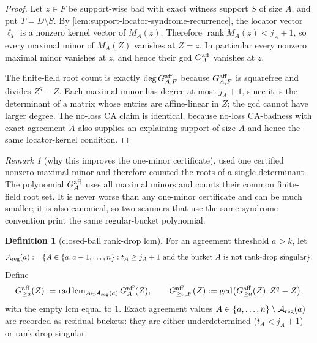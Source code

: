 \documentclass[11pt]{article}
\theoremstyle{definition}
\newtheorem{definition}[theorem]{Definition}
\theoremstyle{remark}
\newtheorem{remark}[theorem]{Remark}
\begin{document}
\begin{proof}
Let $z\in F$ be support-wise bad with exact witness support $S$ of size $A$, and
put $T=D\setminus S$.  By \cref{lem:support-locator-syndrome-recurrence}, the
locator vector $\boldsymbol\ell_T$ is a nonzero kernel vector of $M_A(z)$.
Therefore $\operatorname{rank}M_A(z)<j_A+1$, so every maximal minor of $M_A(Z)$
vanishes at $Z=z$.  In particular every nonzero maximal minor vanishes at $z$,
and hence their gcd $G_A^{\rm aff}$ vanishes at $z$.

The finite-field root count is exactly $\deg G_{A,F}^{\rm aff}$ because
$G_{A,F}^{\rm aff}$ is squarefree and divides $Z^q-Z$.  Each maximal minor has
degree at most $j_A+1$, since it is the determinant of a matrix whose entries are
affine-linear in $Z$; the gcd cannot have larger degree.  The no-loss CA claim is
identical, because no-loss CA-badness with exact agreement $A$ also supplies an
explaining support of size $A$ and hence the same locator-kernel condition.
\end{proof}

\begin{remark}[why this improves the one-minor certificate]
\label{rem:gcd-rankdrop-improves-one-minor}
 used one certified nonzero maximal
minor and therefore counted the roots of a single determinant.  The polynomial
$G_A^{\rm aff}$ uses all maximal minors and counts their common finite-field root
set.  It is never worse than any one-minor certificate and can be much smaller;
it is also canonical, so two scanners that use the same syndrome convention print
the same regular-bucket polynomial.
\end{remark}

\begin{definition}[closed-ball rank-drop lcm]
\label{def:closed-ball-rankdrop-lcm}
For an agreement threshold $a>k$, let
\[
        \mathcal A_{\rm reg}(a):=
        \{A\in\{a,a+1,\ldots,n\}: t_A\ge j_A+1
          \text{ and the bucket }A\text{ is not rank-drop singular}\}.
\]
Define
\[
        G_{\ge a}^{\rm aff}(Z)
        :=\operatorname{rad}\operatorname{lcm}_{A\in\mathcal A_{\rm reg}(a)}
          G_A^{\rm aff}(Z),
        \qquad
        G_{\ge a,F}^{\rm aff}(Z):=
        \gcd\bigl(G_{\ge a}^{\rm aff}(Z),Z^q-Z\bigr),
\]
with the empty lcm equal to $1$.  Exact agreement values
$A\in\{a,\ldots,n\}\setminus\mathcal A_{\rm reg}(a)$ are recorded as residual
buckets: they are either underdetermined ($t_A<j_A+1$) or rank-drop singular.
\end{definition}
\end{document}
